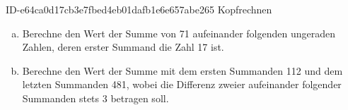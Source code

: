 \begin{exercise}
      {ID-e64ca0d17cb3e7fbed4eb01dafb1e6e657abe265}
      {Kopfrechnen}
  \ifproblem\problem
    \begin{enumerate}[a)]
      \item Berechne den Wert der Summe von 71 aufeinander folgenden ungeraden
            Zahlen, deren erster Summand die Zahl 17 ist.
      \item Berechne den Wert der Summe mit dem ersten Summanden 112 und dem
            letzten Summanden 481, wobei die Differenz zweier aufeinander folgender
            Summanden stets 3 betragen soll.
    \end{enumerate}
  \fi
\end{exercise}
